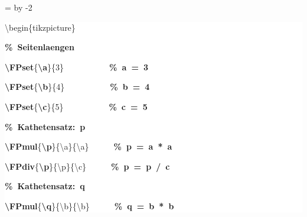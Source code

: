 \begingroup
\ttfamily
{}
=\textwidth
\advance{} by -2\fboxsep
\noindent
\colorbox{background}
{%
\parbox{\dimen255}
{%
\rule[-0.5ex]{0pt}{2.5ex}\hspace*{0.0em}\textbackslash{}begin\{tikzpicture\}\\
\rule[-0.5ex]{0pt}{2.5ex}\hspace*{1.0em}\textcolor{G}{\textbf{\%~Seitenlaengen}}\\
\rule[-0.5ex]{0pt}{2.5ex}\hspace*{1.0em}\textcolor{R}{\textbf{\textbackslash{}FPset}}\{\textcolor{B}{\textbf{\textbackslash{}a}}\}\{3\}~~~~~~~~~~~\textcolor{G}{\textbf{\%~a~=~3}}\\
\rule[-0.5ex]{0pt}{2.5ex}\hspace*{1.0em}\textcolor{R}{\textbf{\textbackslash{}FPset}}\{\textcolor{B}{\textbf{\textbackslash{}b}}\}\{4\}~~~~~~~~~~~\textcolor{G}{\textbf{\%~b~=~4}}\\
\rule[-0.5ex]{0pt}{2.5ex}\hspace*{1.0em}\textcolor{R}{\textbf{\textbackslash{}FPset}}\{\textcolor{B}{\textbf{\textbackslash{}c}}\}\{5\}~~~~~~~~~~~\textcolor{G}{\textbf{\%~c~=~5}}\\
\rule[-0.5ex]{0pt}{2.5ex}\hspace*{1.0em}\textcolor{G}{\textbf{\%~Kathetensatz:~p}}\\
\rule[-0.5ex]{0pt}{2.5ex}\hspace*{1.0em}\textcolor{R}{\textbf{\textbackslash{}FPmul}}\{\textcolor{B}{\textbf{\textbackslash{}p}}\}\{\textbackslash{}a\}\{\textbackslash{}a\}~~~~~~\textcolor{G}{\textbf{\%~p~=~a~*~a}}\\
\rule[-0.5ex]{0pt}{2.5ex}\hspace*{1.0em}\textcolor{R}{\textbf{\textbackslash{}FPdiv}}\{\textcolor{B}{\textbf{\textbackslash{}p}}\}\{\textbackslash{}p\}\{\textbackslash{}c\}~~~~~~\textcolor{G}{\textbf{\%~p~=~p~/~c}}\\
\rule[-0.5ex]{0pt}{2.5ex}\hspace*{1.0em}\textcolor{G}{\textbf{\%~Kathetensatz:~q}}\\
\rule[-0.5ex]{0pt}{2.5ex}\hspace*{1.0em}\textcolor{R}{\textbf{\textbackslash{}FPmul}}\{\textcolor{B}{\textbf{\textbackslash{}q}}\}\{\textbackslash{}b\}\{\textbackslash{}b\}~~~~~~\textcolor{G}{\textbf{\%~q~=~b~*~b}}\\
}}
